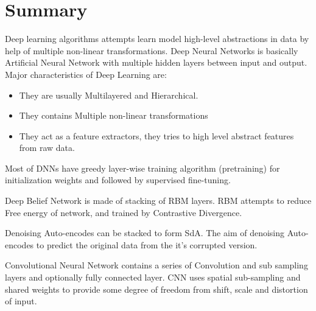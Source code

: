 \section{Summary}
Deep learning algorithms attempts learn model high-level abstractions in data by help of multiple non-linear transformations. Deep Neural Networks is basically Artificial Neural Network with multiple hidden layers between input and output. Major characteristics  of Deep Learning are:
\begin{itemize}
\item They are usually Multilayered and Hierarchical.
\item They contains Multiple non-linear transformations 
\item They act as a feature extractors, they tries to high level abstract features from raw data.
\end{itemize}

Most of DNNs have greedy layer-wise training algorithm (pretraining) for initialization weights and followed by supervised fine-tuning.
 
Deep Belief Network is made of stacking of RBM layers. RBM attempts to reduce Free energy of network, and trained by Contrastive Divergence.
  
Denoising Auto-encodes can be stacked to form SdA. The aim of denoising Auto-encodes to predict the original data from the it's corrupted version.

Convolutional Neural Network contains a series of Convolution and sub sampling layers and optionally fully connected layer. CNN uses spatial sub-sampling and shared weights to provide some degree of freedom from shift, scale and distortion of input.

